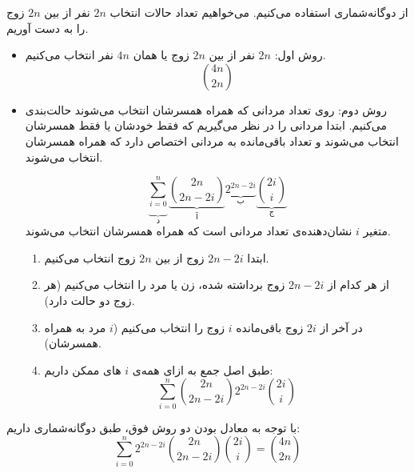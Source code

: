        \p
       از دوگانه‌شماری استفاده می‌کنیم.
         می‌خواهیم تعداد حالات انتخاب
        $2n$
        نفر از بین
        $2n$
        زوج را به دست آوریم.
        
       \begin{itemize}
        \item 
       روش اول:
         $2n$
          نفر از بین 
          $2n$ 
          زوج یا همان 
          $4n$ 
          نفر انتخاب می‌کنیم. 
          $$\binom{4n}{2n}$$
          \item 
       روش دوم:
       روی تعداد مردانی که همراه همسرشان انتخاب می‌شوند حالت‌بندی می‌کنیم. ابتدا مردانی را در نظر می‌گیریم که فقط خودشان یا فقط همسرشان انتخاب می‌شوند و تعداد باقی‌مانده به مردانی اختصاص دارد که همراه همسرشان انتخاب می‌شوند.

        $$\underbrace{\sum\limits_{i=0}^{n}}_{\text{د}} \underbrace{\binom{2n}{2n-2i}}_{\text{آ}} \underbrace{2^{2n-2i}}_{\text{ب}} \underbrace{\binom{2i}{i}}_{\text{ج}}$$
        متغیر
        $i$
        نشان‌دهنده‌ی
        تعداد مردانی است که همراه همسرشان انتخاب می‌شوند. 
        \begin{enumerate}
         \item 
        ابتدا
       $2n-2i$ 
       زوج از بین
       $2n$ 
       زوج انتخاب می‌کنیم. 
        \item 
       از هر کدام از 
       $2n-2i$
       زوج برداشته‌ شده، زن یا مرد را انتخاب می‌کنیم (هر زوج دو حالت دارد).
       \item 
       در آخر از
       $2i$ 
       زوج باقی‌مانده 
       $i$ 
       زوج را انتخاب می‌کنیم
       ($i$ مرد به همراه همسرشان).
       \item 
       طبق اصل جمع
        به ازای همه‌ی
        $i$
        های ممکن داریم:
        $$\sum\limits_{i=0}^{n}\binom{2n}{2n-2i} 2^{2n-2i} \binom{2i}{i}$$

       \end{enumerate}
       \end{itemize}
        \p
        با توجه به معادل بودن دو روش فوق، طبق دوگانه‌شماری داریم:
        $$\sum\limits_{i=0}^{n} 2^{2n-2i} \binom{2n}{2n-2i} \binom{2i}{i} = \binom{4n}{2n}$$
 